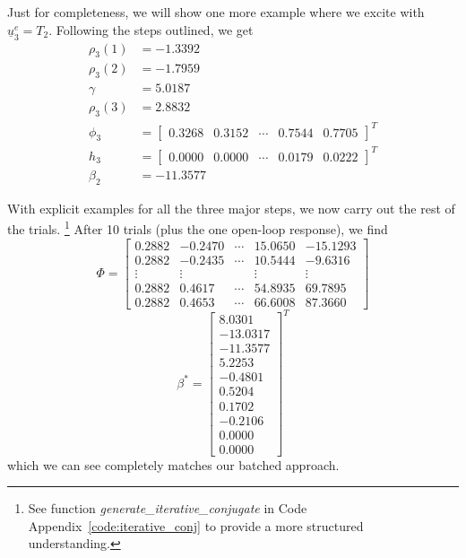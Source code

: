 Just for completeness, we will show one more example where we excite with $\underline{u}^e_3 = T_2$. Following the steps outlined, we get
\begin{equation}
    \begin{split}
        \rho_3(1) &= -1.3392  \\
        \rho_3(2) &= -1.7959 \\
        \gamma &= 5.0187    \\
        \rho_3(3) &= 2.8832 \\
        \phi_3 &= \begin{bmatrix}
            0.3268 &   0.3152 & \cdots &   0.7544  &  0.7705
        \end{bmatrix}^T \\
        h_3 &= \begin{bmatrix}
            0.0000 & 0.0000 & \cdots & 0.0179 & 0.0222
        \end{bmatrix}^T   \\
        \beta_2 &= -11.3577
    \end{split}
\end{equation}

With explicit examples for all the three major steps, we now carry out the rest of the trials.
\footnote{See function \textit{generate\_iterative\_conjugate} in Code Appendix~\ref{code:iterative_conj} to provide a more structured understanding.}
After 10 trials (plus the one open-loop response), we find
\begin{equation}
    \Phi = 
    \begin{bmatrix}
        0.2882  & -0.2470& \cdots  &15.0650 & -15.1293\\
        0.2882  & -0.2435& \cdots  &10.5444 &  -9.6316\\
        \vdots & \vdots &  & \vdots & \vdots \\
        0.2882  &  0.4617& \cdots  &54.8935  & 69.7895\\
        0.2882  &  0.4653& \cdots  &66.6008  & 87.3660
    \end{bmatrix}
\end{equation}
\begin{equation}
    \beta^\ast = \begin{bmatrix}
        8.0301 \\ -13.0317  \\ -11.3577  \\  5.2253 \\  -0.4801  \\  0.5204 \\   0.1702 \\  -0.2106  \\  0.0000  \\  0.0000
    \end{bmatrix}^T
\end{equation}
which we can see completely matches our batched approach.

